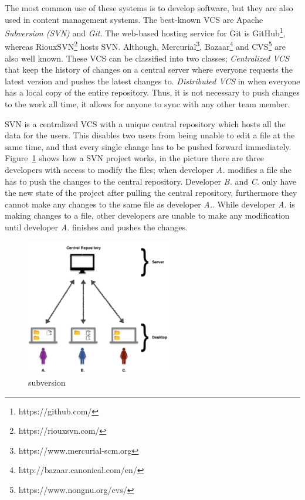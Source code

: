 \documentclass[a4paper, 12pt]{book}
\begin{document}
The most common use of these systems is to develop software, but they are also used in content management systems. The best-known VCS are Apache \emph{Subversion (SVN)} and \emph{Git}. The web-based hosting service for Git is GitHub\footnote{https://github.com/}, whereas RiouxSVN\footnote{https://riouxsvn.com/} hosts SVN. Although, Mercurial\footnote{https://www.mercurial-scm.org}, Bazaar\footnote{http://bazaar.canonical.com/en/} and CVS\footnote{https://www.nongnu.org/cvs/} are also well known. These VCS can be classified into two classes; \emph{Centralized VCS} that keep the history of changes on a central server where everyone requests the latest version and pushes the latest changes to.  \emph{Distributed VCS} in when everyone has a local copy of the entire repository. Thus, it is not necessary to push changes to the work all time, it allows for anyone to sync with any other team member.

SVN is a centralized VCS with a unique central repository which hosts all the data for the users. This disables two users from being unable to edit a file at the same time, and that every single change has to be pushed forward immediately.  Figure~\ref{fig:subversion} shows how a SVN project works, in the picture there are three developers with access to modify the files; when developer \emph{A.} modifies a file she has to push the changes to the central repository. Developer \emph{B.} and \emph{C.} only have the new state of the project after pulling the central repository, furthermore they cannot make any changes to the same file as developer \emph{A.}. While developer \emph{A.} is making changes to a file, other developers are unable to make any modification until developer \emph{A.} finishes and pushes the changes. 

\begin{figure}[ht]
\centering
\includegraphics[height= 6cm]{img/subversion.png}
\caption{subversion}
\label{fig:subversion}       %
\end{figure}
\end{document}
